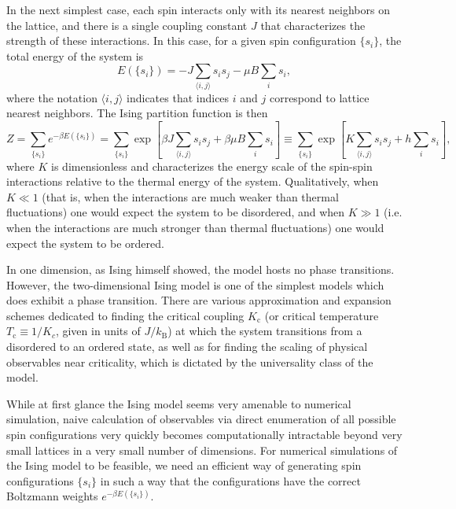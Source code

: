 \documentclass[11pt, oneside]{article}
\newcommand{\kB}{k_\text{B}}
\newcommand{\ijnn}{{\langle{i,j}\rangle}}
\newcommand{\Tc}{T_\text{c}}
\newcommand{\Kc}{K_\text{c}}
\begin{document}
In the next simplest case, each spin interacts only with its nearest neighbors on the lattice, and there is a single coupling constant $J$ that characterizes the strength of these interactions. In this case, for a given spin configuration $\{s_i\}$, the total energy of the system is
$$E(\{s_i\})=-J\sum_\ijnn s_is_j-\mu B\sum_is_i,$$
where the notation $\ijnn$ indicates that indices $i$ and $j$ correspond to lattice nearest neighbors. The Ising partition function is then
$$Z=\sum_{\{s_i\}}e^{-\beta E(\{s_i\})}=\sum_{\{s_i\}}\exp\left[\beta J\sum_\ijnn s_is_j+\beta\mu B\sum_is_i\right]\equiv\sum_{\{s_i\}}\exp\left[K\sum_\ijnn s_is_j+h\sum_is_i\right],$$
where $K$ is dimensionless and characterizes the energy scale of the spin-spin interactions relative to the thermal energy of the system. Qualitatively, when $K\ll1$ (that is, when the interactions are much weaker than thermal fluctuations) one would expect the system to be disordered, and when $K\gg1$ (i.e. when the interactions are much stronger than thermal fluctuations) one would expect the system to be ordered.

In one dimension, as Ising himself showed, the model hosts no phase transitions. However, the two-dimensional Ising model is one of the simplest models which does exhibit a phase transition. There are various approximation and expansion schemes dedicated to finding the critical coupling $\Kc$ (or critical temperature $\Tc\equiv1/K_c$, given in units of $J/\kB$) at which the system transitions from a disordered to an ordered state, as well as for finding the scaling of physical observables near criticality, which is dictated by the universality class of the model.

While at first glance the Ising model seems very amenable to numerical simulation, naive calculation of observables via direct enumeration of all possible spin configurations very quickly becomes computationally intractable beyond very small lattices in a very small number of dimensions. For numerical simulations of the Ising model to be feasible, we need an efficient way of generating spin configurations $\{s_i\}$ in such a way that the configurations have the correct Boltzmann weights $e^{-\beta E(\{s_i\})}$.
\end{document}
